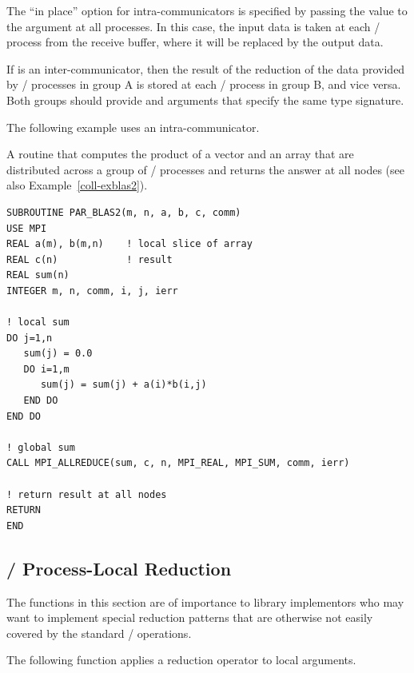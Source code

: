 The ``in place'' option  for intra-communicators is specified by passing the
value  to the argument 
at all processes.
In this case,
the input data is taken at each \MPI/ process from the receive buffer,
where it will be replaced by the output data.

If  is an inter-communicator, then the result of the reduction
of the data provided by \MPI/ processes in group A is stored at each \MPI/ process
in group B, and vice versa.
Both groups should
provide  and  arguments that specify the same type
signature.

The following example uses an intra-communicator.

\begin{example}
\label{coll-exallblas2}
%
A routine that computes
the product of a vector and an array that are distributed across a
group of \MPI/ processes and returns the answer at all nodes (see also
Example~\ref{coll-exblas2}).

\begin{lstlisting}[language={[MPI]Fortran}]
SUBROUTINE PAR_BLAS2(m, n, a, b, c, comm)
USE MPI
REAL a(m), b(m,n)    ! local slice of array
REAL c(n)            ! result
REAL sum(n)
INTEGER m, n, comm, i, j, ierr

! local sum
DO j=1,n
   sum(j) = 0.0
   DO i=1,m
      sum(j) = sum(j) + a(i)*b(i,j)
   END DO
END DO

! global sum
CALL MPI_ALLREDUCE(sum, c, n, MPI_REAL, MPI_SUM, comm, ierr)

! return result at all nodes
RETURN
END
\end{lstlisting}
\end{example}

\subsection{\texorpdfstring{\MPI/}{MPI} Process-Local Reduction}
\label{subsec:coll-process-local-reduction} %

The functions in this section are of importance to library implementors
who may want to implement special reduction patterns that are otherwise
not easily covered by the standard \MPI/ operations.

The following function applies a reduction operator to local arguments.

